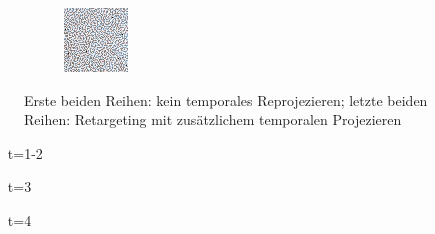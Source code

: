 \begin{figure}[H]
\begin{tcolorbox}[boxrule=4pt,sharp corners=downhill,title=Szene unter Kamerabewegung, fonttitle=\bfseries]
\begin{tcolorbox}[boxrule=4pt,sharp corners=downhill,title=Projektion,colbacktitle=green!50!white, coltitle=black]
\begin{subfigure}[b]{0.2\linewidth}
        \includegraphics[width=\linewidth]{content/TemporalerAlg/Bilder/Reprojection/TemporalRepr/Ausschnitte/Ausschnitt4.png}
         \caption{}
         \label{pic:TemporalRepr_4}
    \end{subfigure}
  \end{tcolorbox}
  \end{tcolorbox}
    \caption{Erste beiden Reihen: kein temporales Reprojezieren; letzte beiden Reihen: Retargeting mit zusätzlichem temporalen Projezieren}
    \label{fig:Auswirkung temporales Projezieren}
\end{figure}

\begin{itemize}
  \item[t=1-2]                  
  \item[t=3] 
  \item[t=4] 
\end{itemize}

